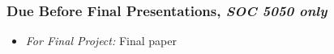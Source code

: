 \documentclass[]{book}
\providecommand{\tightlist}{%
  \setlength{\itemsep}{0pt}\setlength{\parskip}{0pt}}
\theoremstyle{definition}
\theoremstyle{definition}
\theoremstyle{definition}
\theoremstyle{remark}
\begin{document}
\hypertarget{due-before-final-presentations-soc-5050-only}{%
\subsubsection*{\texorpdfstring{Due Before Final Presentations,
\emph{SOC 5050
only}}{Due Before Final Presentations, SOC 5050 only}}\label{due-before-final-presentations-soc-5050-only}}

\begin{itemize}
\tightlist
\item
  \emph{For Final Project:} Final paper
\end{itemize}


\end{document}
